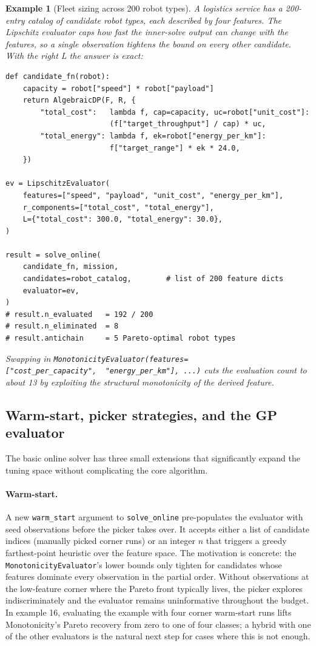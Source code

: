 \documentclass[11pt,a4paper]{article}
\newtheorem{example}[definition]{Example}
\begin{document}
\begin{example}[Fleet sizing across 200 robot types]
A logistics service has a 200-entry catalog of candidate robot
types, each described by four features. The Lipschitz evaluator
caps how fast the inner-solve output can change with the features,
so a single observation tightens the bound on every other candidate.
With the right L the answer is exact:
\begin{lstlisting}
def candidate_fn(robot):
    capacity = robot["speed"] * robot["payload"]
    return AlgebraicDP(F, R, {
        "total_cost":   lambda f, cap=capacity, uc=robot["unit_cost"]:
                        (f["target_throughput"] / cap) * uc,
        "total_energy": lambda f, ek=robot["energy_per_km"]:
                        f["target_range"] * ek * 24.0,
    })

ev = LipschitzEvaluator(
    features=["speed", "payload", "unit_cost", "energy_per_km"],
    r_components=["total_cost", "total_energy"],
    L={"total_cost": 300.0, "total_energy": 30.0},
)

result = solve_online(
    candidate_fn, mission,
    candidates=robot_catalog,        # list of 200 feature dicts
    evaluator=ev,
)
# result.n_evaluated   = 192 / 200
# result.n_eliminated  = 8
# result.antichain     = 5 Pareto-optimal robot types
\end{lstlisting}
Swapping in \texttt{MonotonicityEvaluator(features=["cost\_per\_capacity",\
\ "energy\_per\_km"], ...)} cuts the evaluation count to about 13 by
exploiting the structural monotonicity of the derived feature.
\end{example}

\subsection{Warm-start, picker strategies, and the GP evaluator}
\label{sec:online-tier1}

The basic online solver has three small extensions that significantly
expand the tuning space without complicating the core algorithm.

\paragraph{Warm-start.} A new \texttt{warm\_start} argument to
\texttt{solve\_online} pre-populates the evaluator with seed
observations before the picker takes over. It accepts either a list
of candidate indices (manually picked corner runs) or an integer
$n$ that triggers a greedy farthest-point heuristic over the feature
space. The motivation is concrete: the
\texttt{MonotonicityEvaluator}'s lower bounds only tighten for
candidates whose features dominate every observation in the partial
order. Without observations at the low-feature corner where the
Pareto front typically lives, the picker explores indiscriminately
and the evaluator remains uninformative throughout the budget. In
example 16, evaluating the example with four corner warm-start runs
lifts Monotonicity's Pareto recovery from zero to one of four
classes; a hybrid with one of the other evaluators is the natural
next step for cases where this is not enough.
\end{document}
